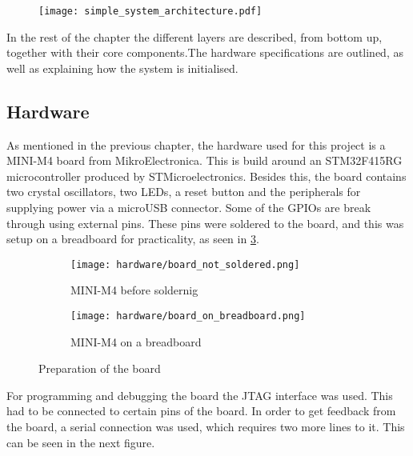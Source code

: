  
\begin{figure}[H]
\centering
\texttt{[image: simple\_system\_architecture.pdf]}
\end{figure}


In the rest of the chapter the different layers are described,
from bottom up, 
together with their core components.The hardware specifications
are outlined, as well as explaining how the system is initialised.


\subsection{Hardware}
As mentioned in the previous chapter, the hardware used for this project 
is a MINI-M4 board from MikroElectronica. This is build around an
STM32F415RG microcontroller produced by STMicroelectronics. Besides
this, the board contains two crystal oscillators, two LEDs, a reset 
button and the peripherals for supplying power via a microUSB connector.
Some of the GPIOs are break through using external pins.
These pins were soldered to the board, and this was setup on a breadboard
for practicality, as seen in \ref{fig:photo1}.

\begin{figure}[H]
\begin{subfigure}{0.5\textwidth}
  \centering
  \texttt{[image: hardware/board\_not\_soldered.png]}
  \caption{MINI-M4 before soldernig}
  \label{fig:sub1}
\end{subfigure}%
\begin{subfigure}{0.5\textwidth}
  \centering
  \texttt{[image: hardware/board\_on\_breadboard.png]}
  \caption{MINI-M4 on a breadboard}
  \label{fig:sub2}
\end{subfigure}
\caption{Preparation of the board}
\label{fig:photo1}
\end{figure}

For programming and debugging the board the JTAG interface was used.
This had to be connected to certain pins of the board. In order to get 
feedback from the board, a serial connection was used, which requires two
more lines to it. This can be seen in the next figure.

